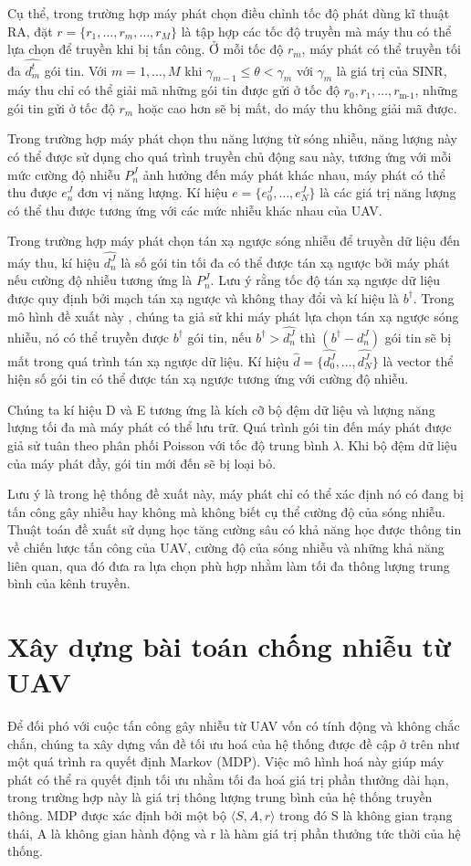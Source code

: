 \documentclass{uetgraduation}
\begin{document}
Cụ thể, trong trường hợp máy
phát chọn điều chỉnh tốc độ phát dùng kĩ thuật RA, đặt $r = \{r_1, \dots, r_m,\dots, r_M\}$ là tập hợp các tốc độ truyền mà máy thu có thể lựa chọn để truyền khi bị tấn
công. Ở mỗi tốc độ $r_m$, máy phát có thể truyền tối đa $\hat{d_m^t}$ gói tin. Với $m = 1, \dots, M$ khi $\gamma_{m-1} \leq \theta < \gamma_m$ với $\gamma_m$ là giá
trị của SINR, máy thu chỉ có thể giải mã những gói tin được gửi ở tốc độ $r_0, r_1, \dots, r_\text{m-1}$, những gói tin gửi ở tốc độ $r_m$ hoặc cao hơn sẽ bị mất,
do máy thu không giải mã được. 

Trong trường hợp máy phát chọn thu năng lượng từ sóng nhiễu, năng lượng này có thể được sử dụng cho quá trình truyền chủ động sau này, tương ứng với mỗi mức cường độ nhiễu $P_n^J$
ảnh hưởng đến máy phát khác nhau, máy phát có thể thu được $e_n^J$ đơn vị năng lượng. Kí hiệu $e = \{e_0^J, \dots, e_N^J\}$ là các giá trị năng lượng có thể thu được tương ứng
với các mức nhiễu khác nhau của UAV.

Trong trường hợp máy phát chọn tán xạ ngược sóng nhiễu để truyền dữ liệu đến máy thu, kí hiệu $\hat{d_n^J}$ là số gói tin tối đa có thể được tán xạ ngược bởi máy phát nếu
cường độ nhiễu tương ứng là $P_n^J$. Lưu ý rằng tốc độ tán xạ ngược dữ liệu được quy định bởi mạch tán xạ ngược và không thay đổi và kí hiệu là $b^{\dagger}$. Trong mô hình đề xuất này
, chúng ta giả sử khi máy phát lựa chọn tán xạ ngược sóng nhiễu, nó có thể truyền được $b^{\dagger}$ gói tin, nếu $b^{\dagger} > \hat{d_n^J}$ thì $(b^{\dagger} - d_n^J)$ gói tin sẽ bị mất trong
quá trình tán xạ ngược dữ liệu. Kí hiệu $\hat{d} = \{\hat{d_0^J}, \dots, \hat{d_N^J}\}$ là vector thể hiện số gói tin có thể được tán xạ ngược tương ứng với cường độ nhiễu.

Chúng ta kí hiệu D và E tương ứng là kích cỡ bộ đệm dữ liệu và lượng năng lượng tối đa mà máy phát có thể lưu trữ. Quá trình gói tin đến máy phát được giả sử tuân theo phân
phối Poisson với tốc độ trung bình $\lambda$. Khi bộ đệm dữ liệu của máy phát đầy, gói tin mới đến sẽ bị loại bỏ.

Lưu ý là trong hệ thống đề xuất này, máy phát chỉ có thể xác định nó có đang bị tấn công gây nhiễu hay không mà không biết cụ thể cường độ của sóng nhiễu. Thuật toán đề xuất sử dụng học tăng 
cường sâu có khả năng học được thông tin về chiến lược tấn công của UAV, cường độ của sóng nhiễu và những khả năng liên quan, qua đó đưa ra lựa chọn
phù hợp nhằm làm tối đa thông lượng trung bình của kênh truyền.


\section{Xây dựng bài toán chống nhiễu từ UAV}
Để đối phó với cuộc tấn công gây nhiễu từ UAV vốn có tính động và không chắc chắn, chúng ta xây dựng vấn đề tối ưu hoá của hệ thống được đề cập ở trên như một quá trình ra quyết định
Markov (MDP). Việc mô hình hoá này giúp máy phát có thể ra quyết định tối ưu nhằm tối đa hoá giá trị phần thưởng dài hạn, trong trường hợp này là giá trị thông lượng trung bình
của hệ thống truyền thông. MDP được xác định bởi một bộ $\langle S, A, r \rangle$ trong đó S là không gian trạng thái, A là không gian hành động và r là hàm giá trị phần thưởng
tức thời của hệ thống.
\end{document}
